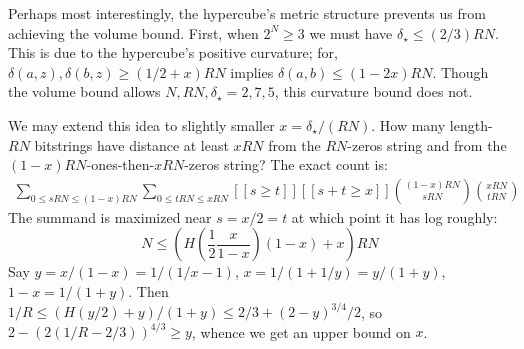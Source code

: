 \documentclass[12pt]{article}
\newcommand{\mpar}[1]{%
    \makebox[0cm]{\hspace{-4.75cm}\parbox{2.5cm}{\raggedleft\color{mblulite}\textsf{#1}}}%
}
\theoremstyle{definition}
\begin{document}
    \mpar{geometry}%
    Perhaps most interestingly, the hypercube's metric structure prevents us
    from achieving the volume bound.
    First, when $2^N \geq 3$ we must have $\delta_\star \leq (2/3) RN$.
    This is due to the hypercube's positive curvature; for,
    $\delta(a,z),\delta(b,z)\geq (1/2 + x)RN$ implies $\delta(a,b)\leq
    (1-2x)RN$.
    Though the volume bound allows $N,RN,\delta_\star=2,7,5$, this curvature
    bound does not.

    We may extend this idea to slightly smaller $x=\delta_\star/(RN)$.  How
    many length-$RN$ bitstrings have distance at least $xRN$ from the
    $RN$-zeros string and from the $(1-x)RN$-ones-then-$xRN$-zeros string?
    The exact count is:
    \begin{align*}
        \sum_{0\leq sRN\leq (1-x)RN} %
        \sum_{0\leq tRN\leq    x RN} %
        [\![s\geq t]\!]              %
        [\![s+t\geq x]\!]            %
        {(1-x)RN \choose sRN}
        {xRN \choose tRN}
    \end{align*}
    The summand is maximized near $s=x/2=t$ at which point
    it has log roughly:
    $$
        N \leq \left(H\left(\frac{1}{2}\frac{x}{1-x}\right)(1-x) + x\right) RN
    $$
    Say $y=x/(1-x)=1/(1/x-1)$, $x=1/(1+1/y)=y/(1+y)$, $1-x=1/(1+y)$.
    Then $1/R \leq (H(y/2)+y)/(1+y) \leq 2/3 + (2-y)^{3/4}/2$,
    so $2-(2(1/R-2/3))^{4/3} \geq y$, whence we get an upper bound on $x$.
    
    \mpar{a map}%

\end{document}

